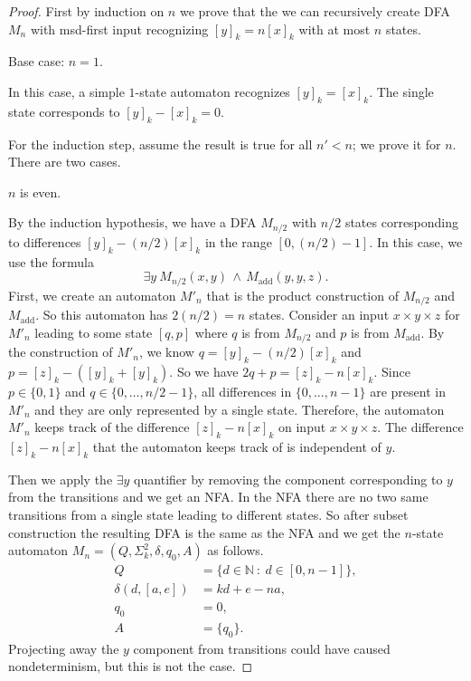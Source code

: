 \documentclass[12pt,reqno]{article}
\def\AND{\, \wedge \,}
\def\suchthat{\ : \ }
\def\add{\text{add}}
\begin{document}
\begin{proof}
First by induction on $n$ we prove that the we can recursively create DFA $M_n$ with msd-first input recognizing $[y]_k = n[x]_k$ with at most $n$ states.

Base case: $n=1$.

In this case, a simple $1$-state automaton recognizes $[y]_k=[x]_k$. The single state corresponds to $[y]_k - [x]_k = 0$.

For the induction step, assume the result is true for all $n'<n$; we prove it for $n$.
There are two cases.

\bigskip{} $n$ is even.

By the induction hypothesis, we have a DFA $M_{n/2}$ with $n/2$ states corresponding to differences $[y]_k - (n/2)[x]_k$ in the range $[0, (n/2)-1]$.
In this case, we use the formula
$$ \exists y \ M_{n/2}(x,y) \AND M_{\add}(y, y, z).$$
First, we create an automaton $M'_{n}$ that is the product construction of $M_{n/2}$ and $M_{\add}$. So this automaton has $2(n/2) = n$ states. Consider an input $x \times y \times z$ for $M'_{n}$ leading to some state $[q, p]$ where $q$ is from $M_{n/2}$ and $p$ is from $M_{\add}$. By the construction of $M'_{n}$, we know $q=[y]_k - (n/2)[x]_k$ and $p=[z]_k - ([y]_k + [y]_k)$. So we have $2q+p = [z]_k - n[x]_k$. Since $p \in \{0, 1\}$ and $q \in \{0, \ldots, n/2 - 1\}$, all differences in $\{0, \ldots, n-1\}$ are present in $M'_{n}$ and they are only represented by a single state.
Therefore, the automaton $M'_{n}$ keeps track of the difference $[z]_k - n[x]_k$ on input $x \times y \times z$. The difference $[z]_k - n[x]_k$ that the automaton keeps track of is independent of $y$.

Then we apply the $\exists y$ quantifier by removing the component corresponding to $y$ from the transitions and we get an NFA. In the NFA there are no two same transitions from a single state leading to different states. So after subset construction the resulting DFA is the same as the NFA and we get the $n$-state automaton $M_{n}=(Q, \Sigma^2_k, \delta, q_0, A)$ as follows.
\begin{align*}
Q &= \{ d \in \mathbb{N}  \suchthat d \in [0, n-1] \}, \\
\delta(d, [a, e]) &= kd + e - n
a, \\
q_0 &= 0, \\
A &= \{q_0\}.
\end{align*}
Projecting away the $y$ component from transitions could have caused nondeterminism, but this is not the case.


\end{proof}
\end{document}
